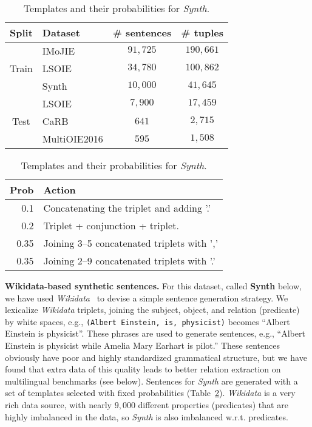\documentclass[letterpaper]{article} \usepackage{aaai22}  \usepackage{times}  \usepackage{helvet}  \usepackage{courier}  \usepackage[hyphens]{url}  \usepackage{graphicx} \usepackage{placeins}
\newcommand{\camera}[1]{\textcolor{black}{#1}}
\begin{document}
\begin{table}[!t]
\centering\small
\begin{tabular*}{\columnwidth}{cp{2.4cm}cc} 
\toprule
\textbf{Split}         & \textbf{Dataset} & \textbf{\# sentences} & \textbf{\# tuples} \\ \hline
\multirow{3}{*}{Train} & IMoJIE  & $91{,}725$ & $190{,}661$  \\ 
                       & LSOIE & $34{,}780$ &  $100{,}862$ \\
                       & Synth & $10{,}000$ & $41{,}645$ \\
\hline
\multirow{4}{*}{Test}  & LSOIE & $7{,}900$  & $17{,}459$ \\                      
                       & CaRB   & $641$ & $2{,}715$ \\
                       & MultiOIE2016 & $595$ & $1{,}508$ \\
\bottomrule
\end{tabular*}

\caption{Dataset statistics; the MultiOIE2016 and Synth numbers are given for each language.}\label{tab:datasets}\vspace{.2cm}

    \begin{tabular}{r|l}\toprule
        \textbf{Prob} & \textbf{Action} \\ \hline
        0.1 & Concatenating the triplet and adding '.' \\
        0.2 & Triplet + conjunction + triplet. \\
        0.35 & Joining 3--5 concatenated triplets with ',' \\
        0.35 & Joining 2--9 concatenated triplets with '.'\\ \bottomrule
    \end{tabular}
    
    \caption{Templates and their probabilities for \emph{Synth}.}\label{tab:templates_wdt_synthetic}
\end{table}

\textbf{Wikidata-based synthetic sentences.} For this dataset, called \textbf{Synth} below,
we have used \emph{Wikidata}~\cite{vrandevcic2014wikidata} to devise a simple sentence generation strategy.
We lexicalize \emph{Wikidata} triplets, joining the subject, object, and relation (predicate) by white spaces, e.g., \texttt{(Albert Einstein, is, physicist)} becomes ``Albert Einstein is physicist''. These phrases are used to generate sentences, e.g., ``Albert Einstein is physicist while Amelia Mary Earhart is pilot.'' These sentences obviously have poor and highly standardized grammatical structure, but we have found that \camera{extra data of} this quality leads to better relation extraction on multilingual benchmarks (see below).
Sentences for \emph{Synth} are generated with a set of templates \camera{selected}
with fixed probabilities (Table~\ref{tab:templates_wdt_synthetic}).
\emph{Wikidata} is a very rich data source, with nearly $9{,}000$ different properties (predicates) that are highly imbalanced in the data, so \emph{Synth} is also imbalanced w.r.t. predicates.
 
\end{document}
